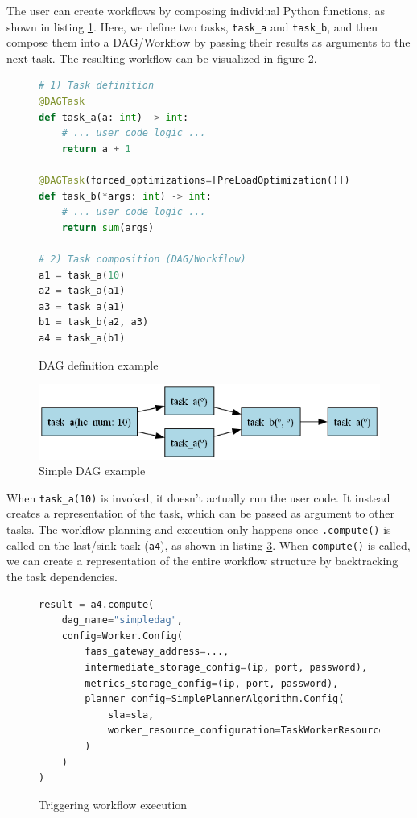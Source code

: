 \documentclass[conference]{IEEEtran}
\begin{document}
The user can create workflows by composing individual Python functions, as shown in listing \ref{lst:dag_lang_example}. Here, we define two tasks, \texttt{task\_a} and \texttt{task\_b}, and then compose them into a DAG/Workflow by passing their results as arguments to the next task. The resulting workflow can be visualized in figure \ref{fig:dag_example}.

\begin{figure}[h]
\centering
\begin{lstlisting}[language=Python, basicstyle=\ttfamily\footnotesize, columns=fullflexible, breaklines=true]
# 1) Task definition
@DAGTask
def task_a(a: int) -> int:
    # ... user code logic ...
    return a + 1

@DAGTask(forced_optimizations=[PreLoadOptimization()])
def task_b(*args: int) -> int:
    # ... user code logic ...
    return sum(args)

# 2) Task composition (DAG/Workflow)
a1 = task_a(10)
a2 = task_a(a1)
a3 = task_a(a1)
b1 = task_b(a2, a3)
a4 = task_a(b1)
\end{lstlisting}
\caption{DAG definition example}
\label{lst:dag_lang_example}
\end{figure}

\begin{figure}[h]
    \centering
    \includegraphics[width=\columnwidth]{figures/dag_lang_example.png}
    \caption{Simple DAG example}
    \label{fig:dag_example}
\end{figure}

When \texttt{task\_a(10)} is invoked, it doesn't actually run the user code. It instead creates a representation of the task, which can be passed as argument to other tasks. The workflow planning and execution only happens once \texttt{.compute()} is called on the last/sink task (\texttt{a4}), as shown in listing \ref{lst:triggering_workflow_execution}. When \texttt{compute()} is called, we can create a representation of the entire workflow structure by backtracking the task dependencies.

\begin{figure}[h]
\centering
\begin{lstlisting}[language=Python, basicstyle=\ttfamily\footnotesize, columns=fullflexible, breaklines=true]
result = a4.compute(
    dag_name="simpledag", 
    config=Worker.Config(
        faas_gateway_address=...,
        intermediate_storage_config=(ip, port, password),
        metrics_storage_config=(ip, port, password),
        planner_config=SimplePlannerAlgorithm.Config(
            sla=sla,
            worker_resource_configuration=TaskWorkerResourceConfiguration(cpus=3, memory_mb=512),
        )
    )
)
\end{lstlisting}
\caption{Triggering workflow execution}
\label{lst:triggering_workflow_execution}
\end{figure}
\end{document}
